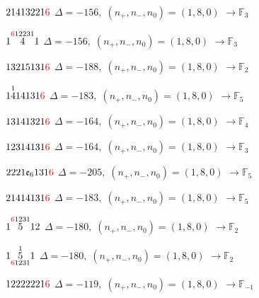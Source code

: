 \documentclass[10pt]{article}
\begin{document}
\smallskip

$21413221\textcolor{red}{6}$ \quad $\Delta=-156,\; (n_+,n_-,n_0)=(1,8,0)$ \quad $\to \mathbb{F}_{3}$

\smallskip

$1\overset{\textcolor{red}{6}12231}{4}1$ \quad $\Delta=-156,\; (n_+,n_-,n_0)=(1,8,0)$ \quad $\to \mathbb{F}_{3}$

\smallskip

$13215131\textcolor{red}{6}$ \quad $\Delta=-188,\; (n_+,n_-,n_0)=(1,8,0)$ \quad $\to \mathbb{F}_{2}$

\smallskip

$1\overset{1}{4}14131\textcolor{red}{6}$ \quad $\Delta=-183,\; (n_+,n_-,n_0)=(1,8,0)$ \quad $\to \mathbb{F}_{5}$

\smallskip

$13141321\textcolor{red}{6}$ \quad $\Delta=-164,\; (n_+,n_-,n_0)=(1,8,0)$ \quad $\to \mathbb{F}_{4}$

$12314131\textcolor{red}{6}$ \quad $\Delta=-164,\; (n_+,n_-,n_0)=(1,8,0)$ \quad $\to \mathbb{F}_{3}$

\smallskip

$2221\mathfrak{e}_6131\textcolor{red}{6}$ \quad $\Delta=-205,\; (n_+,n_-,n_0)=(1,8,0)$ \quad $\to \mathbb{F}_{5}$

\smallskip

$21414131\textcolor{red}{6}$ \quad $\Delta=-183,\; (n_+,n_-,n_0)=(1,8,0)$ \quad $\to \mathbb{F}_{5}$

\smallskip

$1\overset{\textcolor{red}{6}1231}{5}12$ \quad $\Delta=-180,\; (n_+,n_-,n_0)=(1,8,0)$ \quad $\to \mathbb{F}_{2}$

\smallskip

$1\overset{1}{\underset{\textcolor{red}{6}1231}{5}}1$ \quad $\Delta=-180,\; (n_+,n_-,n_0)=(1,8,0)$ \quad $\to \mathbb{F}_{2}$

\smallskip

$12222221\textcolor{red}{6}$ \quad $\Delta=-119,\; (n_+,n_-,n_0)=(1,8,0)$ \quad $\to \mathbb{F}_{-1}$
\end{document}
